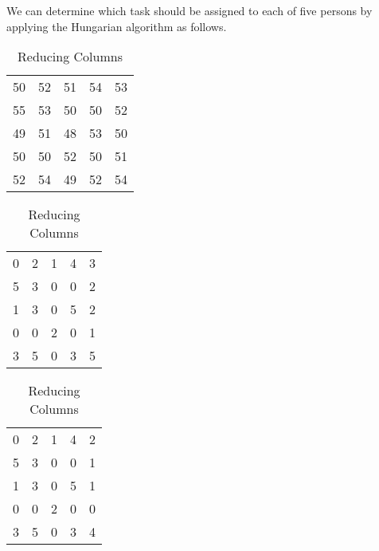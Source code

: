\begin{subquestions}
\begin{subsubquestions}
We can determine which task should be assigned to each of five persons by applying the Hungarian algorithm as follows.
\begin{table}[H]
	\begin{minipage}{0.3\textwidth}
		\centering
		\begin{tabular}{ccccc}
			50 & 52 & 51 & 54 & 53 \\
		    55 & 53 & 50 & 50 & 52 \\
			49 & 51 & 48 & 53 & 50 \\
			50 & 50 & 52 & 50 & 51 \\
			52 & 54 & 49 & 52 & 54 \\
		\end{tabular}
		\captionsetup{width=1.1\linewidth}
		\caption*{Matrix From question}
	\end{minipage}
	\hspace{20pt}
	\begin{minipage}{0.3\textwidth}
		\centering
		\begin{tabular}{ccccc}
			0 & 2 & 1 & 4 & 3 \\
			5 & 3 & 0 & 0 & 2 \\
			1 & 3 & 0 & 5 & 2 \\
			0 & 0 & 2 & 0 & 1 \\
			3 & 5 & 0 & 3 & 5 \\
		\end{tabular}
		\captionsetup{width=1.1\linewidth}
		\caption*{Reducing Rows}
	\end{minipage}
	\hspace{20pt}
	\begin{minipage}{0.3\textwidth}
		\centering
		\begin{tabular}{ccccc}
			0 & 2 & 1 & 4 & 2 \\
			5 & 3 & 0 & 0 & 1 \\
			1 & 3 & 0 & 5 & 1 \\
			0 & 0 & 2 & 0 & 0 \\
			3 & 5 & 0 & 3 & 4 \\
		\end{tabular}
		\captionsetup{width=1.1\linewidth}
		\caption*{Reducing Columns} 
	\end{minipage}
	\vspace{20pt} 
	\begin{minipage}{0.3\textwidth}

\end{minipage}
\end{table}
\end{subsubquestions}
\end{subquestions}
